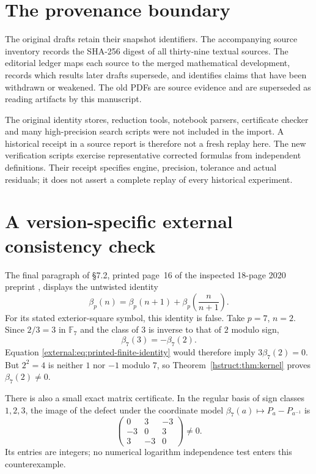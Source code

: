 \section{The provenance boundary}
The original drafts retain their snapshot identifiers. The accompanying
source inventory records the SHA-256 digest of all thirty-nine textual
sources. The editorial ledger maps each source to the merged mathematical
development, records which results later drafts supersede, and identifies
claims that have been withdrawn or weakened. The old PDFs are source
evidence and are superseded as reading artifacts by this manuscript.

The original identity stores, reduction tools, notebook parsers, certificate
checker and many high-precision search scripts were not included in the
import. A historical receipt in a source report is therefore not a fresh
replay here. The new verification scripts exercise representative corrected
formulas from independent definitions. Their receipt specifies engine,
precision, tolerance and actual residuals; it does not assert a complete
replay of every historical experiment.

\section{A version-specific external consistency check}
\label{external:sec:preprint-counterexample}

The final paragraph of \S7.2, printed page~16 of the inspected
18-page 2020 preprint \cite{RadchenkoZagier}, displays the untwisted identity
\begin{equation}\label{external:eq:printed-finite-identity}
 \beta_p(n)=\beta_p(n+1)+\beta_p\!\left(\frac n{n+1}\right).
\end{equation}
For its stated exterior-square symbol, this identity is false.
Take $p=7$, $n=2$. Since $2/3=3$ in $\mathbb F_7$ and the class
of $3$ is inverse to that of $2$ modulo sign,
\[
 \beta_7(3)=-\beta_7(2).
\]
Equation \eqref{external:eq:printed-finite-identity} would therefore imply
$3\beta_7(2)=0$. But $2^2=4$ is neither $1$ nor $-1$ modulo $7$,
so Theorem~\ref{hstruct:thm:kernel} proves $\beta_7(2)\ne0$.

There is also a small exact matrix certificate. In the regular basis
of sign classes $1,2,3$, the image of the defect under the coordinate
model $\beta_7(a)\mapsto P_a-P_{a^{-1}}$ is
\begin{equation}\label{external:eq:p7-defect}
 \begin{pmatrix}
 0&3&-3\\-3&0&3\\3&-3&0
 \end{pmatrix}\ne0.
\end{equation}
Its entries are integers; no numerical logarithm independence test
enters this counterexample.

